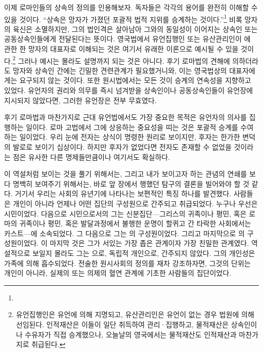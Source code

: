 이제 로마인들의 상속의 정의를 인용해보자.
독자들은 각각의 용어를 완전히 이해할 수 있을 것이다.
``상속은 망자가 가졌던 포괄적 법적 지위를 승계하는 것이다.''\footnote{%
   }
비록 망자의 육신은 소멸하지만,
그의 법인격은 살아남아 그와의 동일성이
이어지는 상속인 또는 공동상속인들에게
전달된다는 뜻이다.
영국법에서 유언집행인 또는
유산관리인이
에 관한 한 망자의 대표자로 이해되는 것은
여기서 유래한 이론으로 예시될 수 있을 것이다.\footnote{유언집행인은
  유언에 의해 지명되고, 유산관리인은 유언이 없는 경우 법원에 의해
  선임된다. 인적재산은 이들이 일단 취득하여 관리^^b7집행하고,
  물적재산은 상속인이나 수유자가 직접 승계했으나,
  오늘날의 영국에서는 물적재산도 인적재산과 마찬가지로 취급된다. }
그러나 예시는 몰라도 설명까지 되는 것은 아니다.
후기 로마법의 견해에 의하더라도
망자와 상속인 간에는 긴밀한 견련관계가 필요했거니와,
이는 영국법상의 대표자에게는 요구되지 않는 것이다.
또한 원시법에서는 모든 것이 승계의 연속성을 지향하고 있었다.
유언자의 권리와 의무를 즉시 넘겨받을 상속인이나 공동상속인들이
유언장에
지시되지 않았다면,
그러한 유언장은 전부 무효였다.

후기 로마법과 마찬가지로 근대 유언법에서도
가장 중요한 목적은 유언자의 의사를 집행하는 일이다.
로마 고법에서 그에 상응하는 중요성을 띠는 것은
포괄적 승계를 수여하는 일이었다.
우리 눈에 전자는 상식이 명령한 원리로 보이지만,
후자는 한가한 변덕의 발로로 보이기 십상이다.
하지만 후자가 없었다면 전자도 존재할 수 없었을 것이라는 점은
유사한 다른 명제들만큼이나 여기서도 확실하다.

이 역설처럼 보이는 것을 풀기 위해서는,
그리고 내가 보이고자 하는 관념의 연쇄를 보다 명백히 보여주기 위해서는,
바로 앞 장에서 행했던 탐구의 결론을 빌어와야 할 것 같다.
거기서 우리는 사회의 유년기에 나타나는 보편적인 특징 하나를 발견했다.
사람들은 개인이 아니라 언제나 어떤 집단의 구성원으로
간주되고 취급되었다.
누구나 우선은 시민이었다.
다음으로 시민으로서의 그는
신분집단---그리스의 귀족이나 평민,
혹은 로마의 귀족이나 평민,
혹은 발달과정에서 불행한 운명이 할퀴고 간 타락한 사회에서는
카스트---에 소속되었다.
그 다음으로 그는 의 구성원이었다.
그리고 마지막으로 의 구성원이었다.
이 마지막 것은 그가 서있는 가장 좁은 관계이자 가장 친밀한 관계였다.
역설적으로 보일지 몰라도 그는 으로,
독립적 개인으로, 간주되지 않았다.
그의 개인성은 가족에 의해 흡수되었다.
전술한 원시사회의 정의를 재차 강조하자면,
그것의 단위는 개인이 아니라,
실제의 또는 의제의 혈연 관계에 기초한 사람들의 집단이었다.

